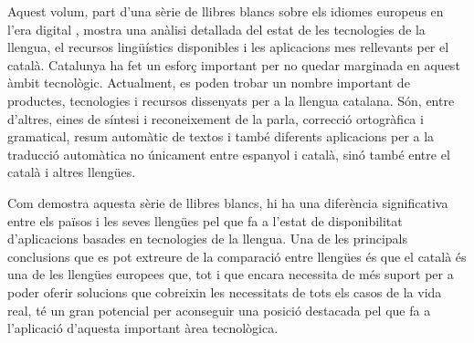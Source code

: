 \begin{multicols}{2}
Aquest volum, part d’una sèrie de llibres blancs sobre els idiomes europeus en l’era digital \cite{Meta1}, mostra una anàlisi detallada del estat de les tecnologies de la llengua, el recursos lingüístics disponibles i les aplicacions mes rellevants per el català. Catalunya ha fet un esforç important per no quedar marginada en aquest àmbit tecnològic. Actualment, es poden trobar un nombre important de productes, tecnologies i recursos dissenyats per a la llengua catalana. Són, entre d’altres, eines de síntesi i reconeixement de la parla, correcció ortogràfica i gramatical, resum automàtic de textos i també diferents aplicacions per a la traducció automàtica no únicament entre espanyol i català, sinó també entre el català i altres llengües. 

Com demostra aquesta sèrie de llibres blancs, hi ha una diferència significativa entre els països i les seves llengües pel que fa a l’estat de disponibilitat d’aplicacions basades en tecnologies de la llengua. Una de les principals conclusions que es pot extreure de la comparació entre llengües és que el català és una de les llengües europees que, tot i que encara necessita de més suport per a poder oferir solucions que cobreixin les necessitats de tots els casos de la vida real, té un gran potencial per aconseguir una posició destacada pel que fa a l’aplicació d’aquesta important àrea tecnològica. 
\end{multicols}

\clearpage


